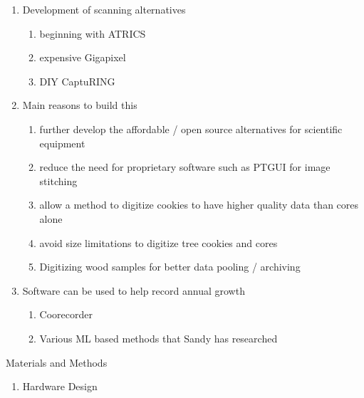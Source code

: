 \documentclass{article}
\begin{document}
\begin{outline}[enumerate]
\begin{enumerate}
	\item Development of scanning alternatives 
		\begin{enumerate}
		\item beginning with ATRICS
		\item expensive Gigapixel
		\item DIY CaptuRING
		\end{enumerate}
	\item Main reasons to build this 
		\begin{enumerate} 
		\item further develop the affordable / open source alternatives for scientific equipment
		\item reduce the need for proprietary software such as PTGUI for image stitching
		\item allow a method to digitize cookies to have higher quality data than cores alone
		\item avoid size limitations to digitize tree cookies and cores 
		\item Digitizing wood samples for better data pooling / archiving
		\end{enumerate} 
	\iffalse
	\item Here we tell you about our new device
		\begin{enumerate}
		\item We review hardware and software %
		\item Then show how the method can be used to record annual growth through current common programs pr ...
		\item Various ML based methods that Sandy has researched
		\end{enumerate}
	\fi
	\item Software can be used to help record annual growth 
		\begin{enumerate}
		\item Coorecorder
		\item Various ML based methods that Sandy has researched
		\end{enumerate}
	\end{enumerate}
\item Materials and Methods
		\begin{enumerate}
		\item Hardware Design
			\begin{enumerate}

\end{enumerate}
\end{enumerate}
\end{outline}
\end{document}
